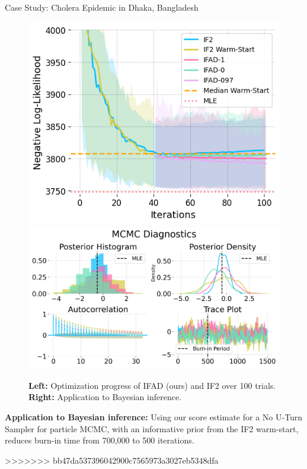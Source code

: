 \documentclass[final]{beamer}
\newlength{\colwidth}
\begin{document}
\begin{frame}[t]
\begin{columns}[t]
\begin{column}{\colwidth}
\begin{exampleblock}{Case Study: Cholera Epidemic in Dhaka, Bangladesh}
\begin{figure}[H]
    \centering
    \includegraphics[scale=0.815]{imgs/095/optim.png}
    \includegraphics[scale=0.562]{imgs/pmcmc/nuts_eb.png}
    \caption{\textbf{Left:} Optimization progress of IFAD (ours) and IF2 \cite{ionides15} over 100 trials. \textbf{Right:} Application to Bayesian inference. 
    }
\end{figure}

    \textbf{Application to Bayesian inference:} Using our score estimate for a No U-Turn Sampler for particle MCMC, with an informative prior from the IF2 warm-start, reduces burn-in time from 700,000 \cite{fasiolo16} to 500 iterations.
  \end{exampleblock}


>>>>>>> bb47da537396042900c7565973a3027eb5348dfa
\vspace{-2ex}
  

\end{column}
\end{columns}
\end{frame}
\end{document}
